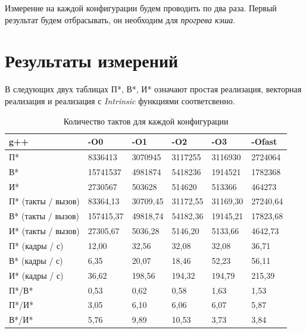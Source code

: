 \documentclass[a4paper, 12pt]{article}
\begin{document}
Измерение на каждой конфигурации будем проводить по два раза. Первый результат будем отбрасывать, он необходим для \textit{прогрева кэша}.


\section*{Результаты измерений}
В следующих двух таблицах П*, В*, И* означают простая реализация, векторная реализация и реализация с \textit{Intrinsic} функциями соответсвенно.\\

\begin{table}[h]
    \begin{tabular}{|l|l|l|l|l|l|}
    \hline
        g++ & -O0 & -O1 & -O2 & -O3 & -Ofast \\ \hline
        П* & 8336413 & 3070945 & 3117255 & 3116930 & 2724064 \\ \hline
        В* & 15741537 & 4981874 & 5418236 & 1914521 & 1782368 \\ \hline
        И* & 2730567 & 503628 & 514620 & 513366 & 464273 \\ \hline
        П* (такты / вызов) & 83364,13 & 30709,45 & 31172,55 & 31169,30 & 27240,64 \\ \hline
        В* (такты / вызов) & 157415,37 & 49818,74 & 54182,36 & 19145,21 & 17823,68 \\ \hline
        И* (такты / вызов) & 27305,67 & 5036,28 & 5146,20 & 5133,66 & 4642,73 \\ \hline
        П* (кадры / с) & 12,00 & 32,56 & 32,08 & 32,08 & 36,71 \\ \hline
        В* (кадры / с) & 6,35 & 20,07 & 18,46 & 52,23 & 56,11 \\ \hline
        И* (кадры / с) & 36,62 & 198,56 & 194,32 & 194,79 & 215,39 \\ \hline
        П*/В* & 0,53 & 0,62 & 0,58 & 1,63 & 1,53 \\ \hline
        П*/И* & 3,05 & 6,10 & 6,06 & 6,07 & 5,87 \\ \hline
        В*/И* & 5,76 & 9,89 & 10,53 & 3,73 & 3,84 \\ \hline
    \end{tabular}
    \caption{Количество тактов для каждой конфигурации}
\end{table}
\end{document}
